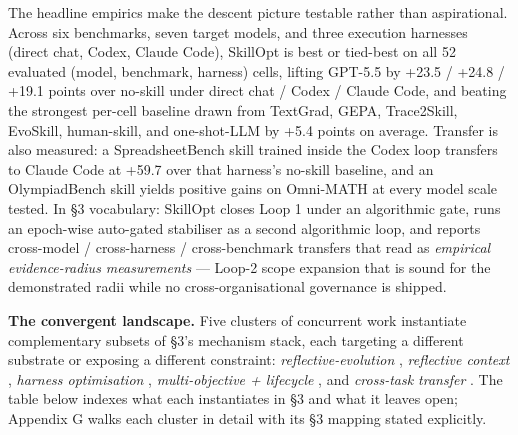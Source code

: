 The headline empirics make the descent picture testable rather than
aspirational. Across six benchmarks, seven target models, and three
execution harnesses (direct chat, Codex, Claude Code), SkillOpt is best
or tied-best on all 52 evaluated (model, benchmark, harness) cells,
lifting GPT-5.5 by +23.5 / +24.8 / +19.1 points over no-skill under
direct chat / Codex / Claude Code, and beating the strongest per-cell
baseline drawn from TextGrad, GEPA, Trace2Skill, EvoSkill, human-skill,
and one-shot-LLM by +5.4 points on average. Transfer is also measured: a
SpreadsheetBench skill trained inside the Codex loop transfers to Claude
Code at +59.7 over that harness's no-skill baseline, and an
OlympiadBench skill yields positive gains on Omni-MATH at every model
scale tested. In §3 vocabulary: SkillOpt closes Loop 1 under an
algorithmic gate, runs an epoch-wise auto-gated stabiliser as a second
algorithmic loop, and reports cross-model / cross-harness /
cross-benchmark transfers that read as \emph{empirical evidence-radius
measurements} --- Loop-2 scope expansion that is sound for the
demonstrated radii while no cross-organisational governance is shipped.

\textbf{The convergent landscape.} Five clusters of concurrent work
instantiate complementary subsets of §3's mechanism stack, each
targeting a different substrate or exposing a different constraint:
\emph{reflective-evolution}
\citetext{\citealp[GEPA,][]{agrawal2025gepa}; \citealp{tiwari2026fastandslow}},
\emph{reflective context} \citep{vassilyev2026rcl}, \emph{harness
optimisation}
\citetext{\citealp[Meta-Harness,][]{lee2026metaharness}; \citealp[AHE,][]{lin2026ahe}; \citealp[MOSS,][]{cai2026moss}; \citealp[CANTANTE,][]{zehle2026cantante}; \citealp{ong2026harnesseval}},
\emph{multi-objective + lifecycle}
\citetext{\citealp[MOCHA,][]{tanjim2026mocha}; \citealp[Ratchet,][]{zhang2026ratchet}},
and \emph{cross-task transfer}
\citetext{\citealp[ICT,][]{shalev2026ict}; \citealp[Combee,][]{li2026combee}; \citealp[CORAL,][]{qu2026coral}; \citealp[PACE,][]{ling2026pace}}.
The table below indexes what each instantiates in §3 and what it leaves
open; Appendix G walks each cluster in detail with its §3 mapping stated
explicitly.

